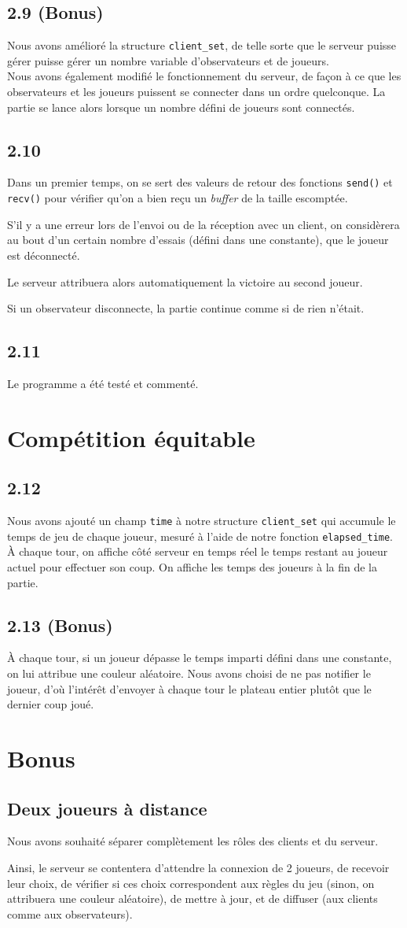 \documentclass[12pt]{article}
\def\question#1{\subsection{#1}}
\def\sec#1{\section{#1}}
\begin{document}
\question{2.9 (Bonus)}
Nous avons amélioré la structure \texttt{client\_set}, de telle sorte que le serveur puisse gérer puisse gérer un nombre variable d'observateurs et de joueurs. \\
Nous avons également modifié le fonctionnement du serveur, de façon à ce que les observateurs et les joueurs puissent se connecter dans un ordre quelconque. La partie se lance alors lorsque un nombre défini de joueurs sont connectés.

\question{2.10}
Dans un premier temps, on se sert des valeurs de retour des fonctions \texttt{send()} et \texttt{recv()} pour vérifier qu'on a bien reçu un \textit{buffer} de la taille escomptée.

S'il y a une erreur lors de l'envoi ou de la réception avec un client, on considèrera au bout d'un certain nombre d'essais (défini dans une constante), que le joueur est déconnecté.

Le serveur attribuera alors automatiquement la victoire au second joueur. 

Si un observateur disconnecte, la partie continue comme si de rien n'était.
\question{2.11}
Le programme a été testé et commenté.

\sec{Compétition équitable}

\question{2.12}
Nous avons ajouté un champ \texttt{time} à notre structure \texttt{client\_set} qui accumule le temps de jeu de chaque joueur, mesuré à l'aide de notre fonction \texttt{elapsed\_time}. \\
À chaque tour, on affiche côté serveur en temps réel le temps restant au joueur actuel pour effectuer son coup.
On affiche les temps des joueurs à la fin de la partie.

\question{2.13 (Bonus)}
À chaque tour, si un joueur dépasse le temps imparti défini dans une constante, on lui attribue une couleur aléatoire. Nous avons choisi de ne pas notifier le joueur, d'où l'intérêt d'envoyer à chaque tour le plateau entier plutôt que le dernier coup joué.

\sec{Bonus}
\question{Deux joueurs à distance}
Nous avons souhaité séparer complètement les rôles des clients et du serveur.

Ainsi, le serveur se contentera d'attendre la connexion de 2 joueurs, de recevoir leur choix, de vérifier si ces choix correspondent aux règles du jeu (sinon, on attribuera une couleur aléatoire), de mettre à jour, et de diffuser (aux clients comme aux observateurs).
\end{document}
